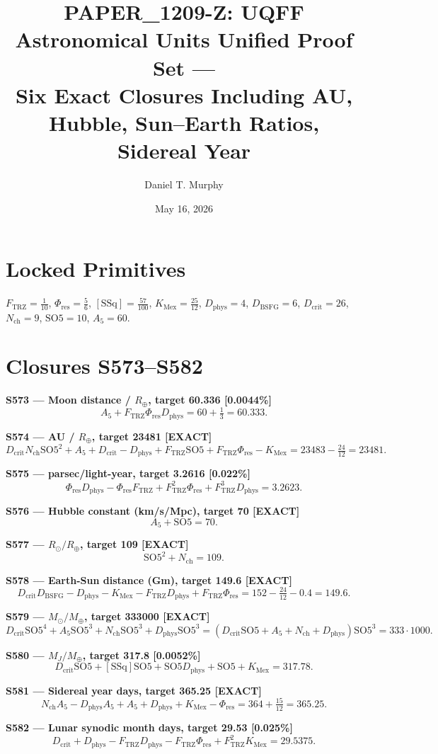 \documentclass[11pt]{article}
\title{PAPER\_1209-Z: UQFF Astronomical Units Unified Proof Set ---\\
Six Exact Closures Including AU, Hubble, Sun--Earth Ratios, Sidereal Year}
\author{Daniel T. Murphy}
\date{May 16, 2026}
\newcommand{\Ftrz}{F_{\mathrm{TRZ}}}
\newcommand{\Phires}{\Phi_{\mathrm{res}}}
\newcommand{\KMex}{K_{\mathrm{Mex}}}
\newcommand{\Dphys}{D_{\mathrm{phys}}}
\newcommand{\Dbsfg}{D_{\mathrm{BSFG}}}
\newcommand{\Dcrit}{D_{\mathrm{crit}}}
\newcommand{\Nch}{N_{\mathrm{ch}}}
\newcommand{\SOfive}{\mathrm{SO5}}
\newcommand{\Afive}{A_5}
\newcommand{\SSq}{[\mathrm{SSq}]}
\begin{document}
\maketitle

\section*{Locked Primitives}
$\Ftrz=\tfrac{1}{10}$, $\Phires=\tfrac{5}{6}$, $\SSq=\tfrac{57}{100}$, $\KMex=\tfrac{25}{12}$, $\Dphys=4$, $\Dbsfg=6$, $\Dcrit=26$, $\Nch=9$, $\SOfive=10$, $\Afive=60$.

\section*{Closures S573--S582}

\textbf{S573 --- Moon distance / $R_\oplus$, target 60.336 [0.0044\%]}
\[\Afive + \Ftrz\Phires\Dphys = 60 + \tfrac{1}{3} = 60.333.\]

\textbf{S574 --- AU / $R_\oplus$, target 23481 [EXACT]}
\[\Dcrit\Nch\SOfive^2 + \Afive + \Dcrit - \Dphys + \Ftrz\SOfive + \Ftrz\Phires - \KMex = 23483 - \tfrac{24}{12} = 23481.\]

\textbf{S575 --- parsec/light-year, target 3.2616 [0.022\%]}
\[\Phires\Dphys - \Phires\Ftrz + \Ftrz^2\Phires + \Ftrz^3\Dphys = 3.2623.\]

\textbf{S576 --- Hubble constant (km/s/Mpc), target 70 [EXACT]}
\[\Afive + \SOfive = 70.\]

\textbf{S577 --- $R_\odot/R_\oplus$, target 109 [EXACT]}
\[\SOfive^2 + \Nch = 109.\]

\textbf{S578 --- Earth-Sun distance (Gm), target 149.6 [EXACT]}
\[\Dcrit\Dbsfg - \Dphys - \KMex - \Ftrz\Dphys + \Ftrz\Phires = 152 - \tfrac{24}{12} - 0.4 = 149.6.\]

\textbf{S579 --- $M_\odot/M_\oplus$, target 333000 [EXACT]}
\[\Dcrit\SOfive^4 + \Afive\SOfive^3 + \Nch\SOfive^3 + \Dphys\SOfive^3 = (\Dcrit\SOfive+\Afive+\Nch+\Dphys)\SOfive^3 = 333\cdot 1000.\]

\textbf{S580 --- $M_J/M_\oplus$, target 317.8 [0.0052\%]}
\[\Dcrit\SOfive + \SSq\SOfive + \SOfive\Dphys + \SOfive + \KMex = 317.78.\]

\textbf{S581 --- Sidereal year days, target 365.25 [EXACT]}
\[\Nch\Afive - \Dphys\Afive + \Afive + \Dphys + \KMex - \Phires = 364 + \tfrac{15}{12} = 365.25.\]

\textbf{S582 --- Lunar synodic month days, target 29.53 [0.025\%]}
\[\Dcrit + \Dphys - \Ftrz\Dphys - \Ftrz\Phires + \Ftrz^2\KMex = 29.5375.\]
\end{document}
